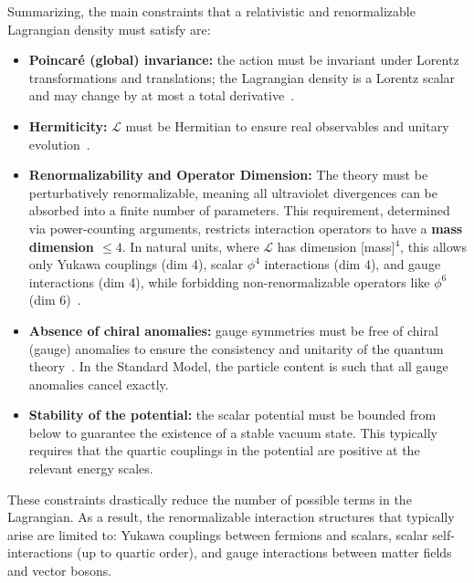 Summarizing, the main constraints that a relativistic and renormalizable Lagrangian density must satisfy are:
\begin{itemize}
	\item \textbf{Poincaré (global) invariance:} the action must be invariant under Lorentz transformations and translations; the Lagrangian density is a Lorentz scalar and may change by at most a total derivative~\parencite{pall,jose1998classical}. 
	\item \textbf{Hermiticity:} $\mathcal{L}$ must be Hermitian to ensure real observables and unitary evolution~\parencite{pall,peskin}.
	\item \textbf{Renormalizability and Operator Dimension:} The theory must be perturbatively renormalizable, meaning all ultraviolet divergences can be absorbed into a finite number of parameters. This requirement, determined via power-counting arguments, restricts interaction operators to have a \textbf{mass dimension $\leq 4$}. In natural units, where $\mathcal{L}$ has dimension [mass]$^4$, this allows only Yukawa couplings (dim 4), scalar $\phi^4$ interactions (dim 4), and gauge interactions (dim 4), while forbidding non-renormalizable operators like $\phi^6$ (dim 6)~\parencite{peskin,Weinberg}.
	\item \textbf{Absence of chiral anomalies:} gauge symmetries must be free of chiral (gauge) anomalies to ensure the consistency and unitarity of the quantum theory~\parencite{peskin,Weinberg,bertlmann1996anomalies}. In the Standard Model, the particle content is such that all gauge anomalies cancel exactly.
	\item \textbf{Stability of the potential:} the scalar potential must be bounded from below to guarantee the existence of a stable vacuum state. This typically requires that the quartic couplings in the potential are positive at the relevant energy scales.
\end{itemize}

These constraints drastically reduce the number of possible terms in the Lagrangian. As a result, the renormalizable interaction structures that typically arise are limited to: Yukawa couplings between fermions and scalars, scalar self-interactions (up to quartic order), and gauge interactions between matter fields and vector bosons.

